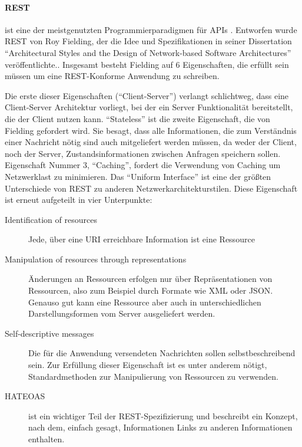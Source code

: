 \documentclass[12pt,a4paper,bibliography=totocnumbered,listof=totocnumbered]{scrartcl}
\begin{document}
\paragraph{\acf{REST}} ist eine der meistgenutzten Programmierparadigmen für \acp{API} \cite{duvander}. Entworfen wurde \ac{REST} von Roy Fielding, der die Idee und Spezifikationen in seiner Dissertation \enquote{Architectural Styles and the Design of Network-based Software Architectures} veröffentlichte.\cite{fielding}. Insgesamt besteht Fielding auf 6 Eigenschaften, die erfüllt sein müssen um eine REST-Konforme Anwendung zu schreiben.

Die erste dieser Eigenschaften (\enquote{Client-Server}) verlangt schlichtweg, dass eine Client-Server Architektur vorliegt, bei der ein Server Funktionalität bereitstellt, die der Client nutzen kann.
\enquote{Stateless} ist die zweite Eigenschaft, die von Fielding gefordert wird. Sie besagt, dass alle Informationen, die zum Verständnis einer Nachricht nötig sind auch mitgeliefert werden müssen, da weder der Client, noch der Server, Zustandsinformationen zwischen Anfragen speichern sollen.
Eigenschaft Nummer 3, \enquote{Caching}, fordert die Verwendung von Caching um Netzwerklast zu minimieren.
Das \enquote{Uniform Interface} ist eine der größten Unterschiede von REST zu anderen Netzwerkarchitekturstilen. Diese Eigenschaft ist erneut aufgeteilt in vier Unterpunkte:

\begin{description}  
	\item [Identification of resources] Jede, über eine URI erreichbare Information ist eine Ressource
	\item [Manipulation of resources through representations] Änderungen an Ressourcen erfolgen nur über Repräsentationen von Ressourcen, also zum Beispiel durch Formate wie XML oder JSON. Genauso gut kann eine Ressource aber auch in unterschiedlichen Darstellungsformen vom Server ausgeliefert werden.
	\item [Self-descriptive messages] Die für die Anwendung versendeten Nachrichten sollen selbstbeschreibend sein. Zur Erfüllung dieser Eigenschaft ist es unter anderem nötigt, Standardmethoden zur Manipulierung von Ressourcen zu verwenden.
	\item [\acf{HATEOAS}] ist ein wichtiger Teil der REST-Spezifizierung und beschreibt ein Konzept, nach dem, einfach gesagt, Informationen Links zu anderen Informationen enthalten. 
\end{description}
\end{document}
